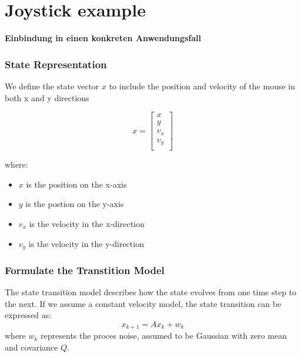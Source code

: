 \documentclass{beamer}
\begin{document}
\section{Joystick example}

\begin{frame}
    \huge
    \textbf{Einbindung in einen konkreten Anwendungsfall}
\end{frame}

\begin{frame}
    \frametitle{State Representation}
    We define the state vector \(x\) to include the position and velocity of the mouse in both x and y directions

    \begin{equation*}
        x = \begin{bmatrix}
            x     \\
            y     \\
            v_{x} \\
            v_{y} \\
        \end{bmatrix}
    \end{equation*}

    where:
    \begin{itemize}
        \item \(x\) is the position on the x-axis
        \item \(y\) is the postion on the y-axis
        \item \(v_{x}\) is the velocity in the x-direction
        \item \(v_{y}\) is the velocity in the y-direction

    \end{itemize}
\end{frame}

\begin{frame}
    \frametitle{Formulate the Transtition Model}
    The state transition model describes how the state evolves from one time step to the next.
    If we assume a constant velocity model, the state transition can be expressed as:
    \begin{equation*}
        x_{k+1}=Ax_{k}+w_{k}
    \end{equation*}
    where \(w_{k}\) represents the proces noise, assumed to be Gaussian with zero mean and covariance \(Q\).
\end{frame}
\end{document}
